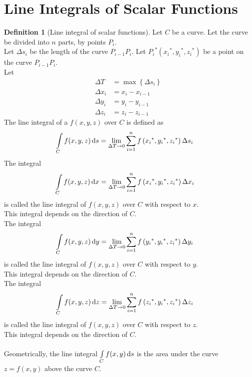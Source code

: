 \documentclass[fleqn, a4paper, 12pt, twoside]{article}
\theoremstyle{definition}
\newtheorem{definition}{Definition}
\theoremstyle{theorem}
\begin{document}
{\section{Line Integrals of Scalar Functions}

\begin{definition}[Line integral of scalar functions]
	Let $C$ be a curve.
	Let the curve be divided into $n$ parts, by points $P_i$.\\
	Let $\Delta s_i$ be the length of the curve $P_{i - 1} P_i$.
	Let ${P_i}^*\left( {x_i}^* , {y_i}^* , {z_i}^* \right)$ be a point on the curve $P_{i - 1} P_i$.\\
	Let 
	\begin{align*}
		\Delta T   & = \max\left\{ \Delta s_i \right\} \\
		\Delta x_i & = x_i - x_{i - 1}                 \\
		\Delta y_i & = y_i - y_{i - 1}                 \\
		\Delta z_i & = z_i - z_{i - 1}
	\end{align*}
	The line integral of a $f(x,y,z)$ over $C$ is defined as
	\begin{align*}
		\int\limits_{C} f(x,y,z) \dif s & =  \lim\limits_{\Delta T \to 0} \sum\limits_{i = 1}^{n} f\left( {x_i}^* , {y_i}^* , {z_i}^* \right) \Delta s_i
	\end{align*}
	The integral
	\begin{align*}
		\int\limits_{C} f(x,y,z) \dif x & =  \lim\limits_{\Delta T \to 0} \sum\limits_{i = 1}^{n} f\left( {x_i}^* , {y_i}^* , {z_i}^* \right) \Delta x_i
	\end{align*}
	is called the line integral of $f(x,y,z)$ over $C$ with respect to $x$.\\
	This integral depends on the direction of $C$.\\
	The integral
	\begin{align*}
		\int\limits_{C} f(x,y,z) \dif y & =  \lim\limits_{\Delta T \to 0} \sum\limits_{i = 1}^{n} f\left( {y_i}^* , {y_i}^* , {z_i}^* \right) \Delta y_i
	\end{align*}
	is called the line integral of $f(x,y,z)$ over $C$ with respect to $y$.\\
	This integral depends on the direction of $C$.\\
	The integral
	\begin{align*}
		\int\limits_{C} f(x,y,z) \dif z & =  \lim\limits_{\Delta T \to 0} \sum\limits_{i = 1}^{n} f\left( {z_i}^* , {y_i}^* , {z_i}^* \right) \Delta z_i
	\end{align*}
	is called the line integral of $f(x,y,z)$ over $C$ with respect to $z$.\\
	This integral depends on the direction of $C$.\\
	~\\
	Geometrically, the line integral $\int\limits_{C} f(x,y) \dif s$ is the area under the curve $z = f(x,y)$ above the curve $C$.
\end{definition}

}
\end{document}
